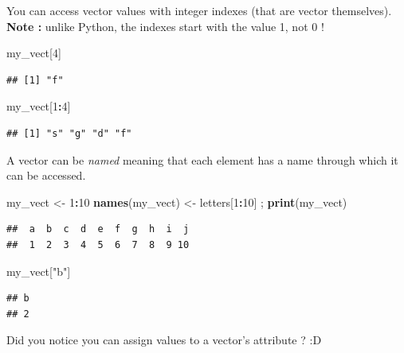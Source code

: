 \documentclass[
]{book}
\newenvironment{Shaded}{\begin{snugshade}}{\end{snugshade}}
\newcommand{\DecValTok}[1]{\textcolor[rgb]{0.00,0.00,0.81}{#1}}
\newcommand{\KeywordTok}[1]{\textcolor[rgb]{0.13,0.29,0.53}{\textbf{#1}}}
\newcommand{\NormalTok}[1]{#1}
\newcommand{\OperatorTok}[1]{\textcolor[rgb]{0.81,0.36,0.00}{\textbf{#1}}}
\newcommand{\StringTok}[1]{\textcolor[rgb]{0.31,0.60,0.02}{#1}}
\begin{document}
You can access vector values with integer indexes (that are vector themselves). \textbf{Note :} unlike Python, the indexes start with the value 1, not 0 !

\begin{Shaded}
\begin{Highlighting}[]
\NormalTok{my_vect[}\DecValTok{4}\NormalTok{]}
\end{Highlighting}
\end{Shaded}

\begin{verbatim}
## [1] "f"
\end{verbatim}

\begin{Shaded}
\begin{Highlighting}[]
\NormalTok{my_vect[}\DecValTok{1}\OperatorTok{:}\DecValTok{4}\NormalTok{]}
\end{Highlighting}
\end{Shaded}

\begin{verbatim}
## [1] "s" "g" "d" "f"
\end{verbatim}

A vector can be \emph{named} meaning that each element has a name through which it can be accessed.

\begin{Shaded}
\begin{Highlighting}[]
\NormalTok{my_vect <-}\StringTok{ }\DecValTok{1}\OperatorTok{:}\DecValTok{10}
\KeywordTok{names}\NormalTok{(my_vect) <-}\StringTok{ }\NormalTok{letters[}\DecValTok{1}\OperatorTok{:}\DecValTok{10}\NormalTok{] ; }\KeywordTok{print}\NormalTok{(my_vect)}
\end{Highlighting}
\end{Shaded}

\begin{verbatim}
##  a  b  c  d  e  f  g  h  i  j 
##  1  2  3  4  5  6  7  8  9 10
\end{verbatim}

\begin{Shaded}
\begin{Highlighting}[]
\NormalTok{my_vect[}\StringTok{"b"}\NormalTok{]}
\end{Highlighting}
\end{Shaded}

\begin{verbatim}
## b 
## 2
\end{verbatim}

Did you notice you can assign values to a vector's attribute ? :D
\end{document}
